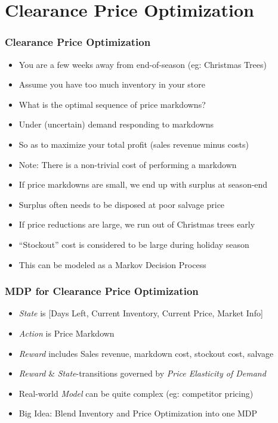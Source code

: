 \documentclass[handout]{beamer}
\begin{document}
\section{Clearance Price Optimization}

\begin{frame}
\frametitle{Clearance Price Optimization}
\pause
\begin{itemize}[<+->]
\item You are a few weeks away from end-of-season (eg: Christmas Trees)
\item Assume you have too much inventory in your store
\item What is the optimal sequence of price markdowns?
\item Under (uncertain) demand responding to markdowns
\item So as to maximize your total profit (sales revenue minus costs)
\item Note: There is a non-trivial cost of performing a markdown
\item If price markdowns are small, we end up with surplus at season-end
\item Surplus often needs to be disposed at poor salvage price
\item If price reductions are large, we run out of Christmas trees early
\item ``Stockout'' cost is considered to be large during holiday season
\item This can be modeled as a Markov Decision Process
\end{itemize}
\end{frame}

\begin{frame}
\frametitle{MDP for Clearance Price Optimization}
\pause
\begin{itemize}[<+->]
\item {\em State} is [Days Left, Current Inventory, Current Price, Market Info]
\item {\em Action} is Price Markdown
\item {\em Reward} includes Sales revenue, markdown cost, stockout cost, salvage
\item {\em Reward} \& {\em State}-transitions governed by {\em Price Elasticity of Demand}
\item Real-world {\em Model} can be quite complex (eg: competitor pricing)
\item Big Idea: Blend Inventory and Price Optimization into one MDP
\end{itemize}
\end{frame}
\end{document}
